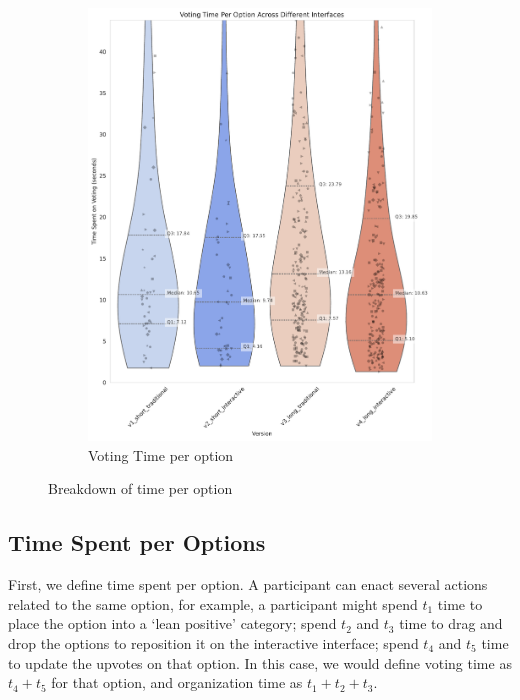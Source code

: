 \begin{figure}[ht]
\begin{subfigure}[b]{0.32\textwidth}
        \includegraphics[width=\textwidth]{content/image/results/voting_time_per_option.pdf}
        \caption{Voting Time per option}
        \label{fig:vote_time}
    \end{subfigure}
    \caption{Breakdown of time per option}
    \label{fig:Time Spent Per Option Per Person}
\end{figure}

\subsection{Time Spent per Options}
First, we define time spent per option. A participant can enact several actions related to the same option, for example, a participant might spend $t_1$ time to place the option into a `lean positive' category; spend $t_2$ and $t_3$ time to drag and drop the options to reposition it on the interactive interface; spend $t_4$ and $t_5$ time to update the upvotes on that option. In this case, we would define voting time as $t_4 + t_5$ for that option, and organization time as $t_1 + t_2 + t_3$.

